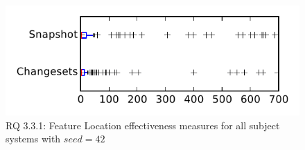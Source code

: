 
\begin{figure}
\centering
\includegraphics[height=0.4\textheight]{figures/flt_seed/rq1_tiny_42}
\caption{RQ 3.3.1: Feature Location effectiveness measures for all subject systems with $seed=42$}
\label{fig:flt_seed:rq1:tiny}
\end{figure}
